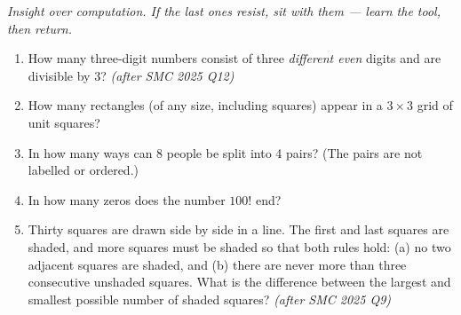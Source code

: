 \documentclass[11pt,a4paper]{article}
\begin{document}
\noindent\textit{Insight over computation. If the last ones resist, sit with them --- learn the tool, then return.}

\begin{enumerate}

\item How many three-digit numbers consist of three \emph{different even} digits and are divisible by 3? \textit{\small(after SMC 2025 Q12)}

\item How many rectangles (of any size, including squares) appear in a $3\times 3$ grid of unit squares?

\item In how many ways can 8 people be split into 4 pairs? (The pairs are not labelled or ordered.)

\item In how many zeros does the number $100!$ end?

\item Thirty squares are drawn side by side in a line. The first and last squares are shaded, and more squares must be shaded so that both rules hold: (a) no two adjacent squares are shaded, and (b) there are never more than three consecutive unshaded squares. What is the difference between the largest and smallest possible number of shaded squares? \textit{\small(after SMC 2025 Q9)}

\end{enumerate}

\end{document}
